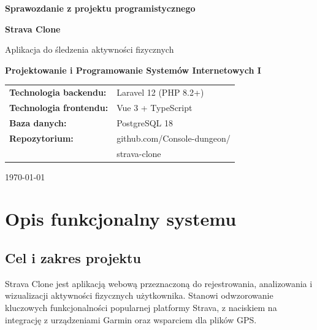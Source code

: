 \documentclass[12pt,a4paper]{report}
\begin{document}
\begin{titlepage}
    \centering
    \vspace*{2cm}

    {\LARGE\bfseries Sprawozdanie z projektu programistycznego\par}
    \vspace{1.5cm}

    {\Huge\bfseries Strava Clone\par}
    \vspace{0.5cm}
    {\large Aplikacja do śledzenia aktywności fizycznych\par}

    \vspace{1cm}
    {\large\bfseries Projektowanie i Programowanie Systemów Internetowych I\par}

    \vspace{1.5cm}

    \begin{tabular}{ll}
        \textbf{Technologia backendu:}  & Laravel 12 (PHP 8.2+)       \\[4pt]
        \textbf{Technologia frontendu:} & Vue 3 + TypeScript           \\[4pt]
        \textbf{Baza danych:}           & PostgreSQL 18                \\[4pt]
        \textbf{Repozytorium:}          & github.com/Console-dungeon/ \\
                                        & strava-clone                 \\
    \end{tabular}

    \vfill

    {\large \today\par}
\end{titlepage}

\tableofcontents
\thispagestyle{empty}
\cleardoublepage

\chapter{Opis funkcjonalny systemu}
\label{ch:funkcjonalny}

\section{Cel i zakres projektu}

Strava Clone jest aplikacją webową przeznaczoną do rejestrowania, analizowania i wizualizacji aktywności fizycznych użytkownika. Stanowi odwzorowanie kluczowych funkcjonalności popularnej platformy Strava, z naciskiem na integrację z urządzeniami Garmin oraz wsparciem dla plików GPS.
\end{document}
